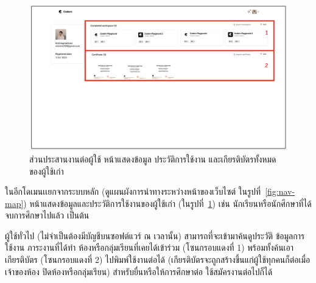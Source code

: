 \documentclass[12pt,oneside,openright,a4paper]{cpe-thai-project}
\begin{document}
    \hypertarget{ui-archive1}{
        \begin{figure}[H]
        \centering
            \includegraphics[width=15cm]{figure/ui/ui-archive1.png}
            \caption[ส่วนประสานงานต่อผู้ใช้ หน้าแสดงข้อมูลของผู้ใช้เก่า]{ส่วนประสานงานต่อผู้ใช้ หน้าแสดงข้อมูล ประวัติการใช้งาน และเกียรติบัตรทั้งหมด ของผู้ใช้เก่า}
            \label{fig:ui-archive1}
        \end{figure}
    }
    
    \begin{flushleft}
    ในอีกโดเมนเเยกจากระบบหลัก (ดูแผนผังการนำทางระหว่างหน้าของเว็บไซต์ ในรูปที่~\ref{fig:nav-map}) หน้าแสดงข้อมูลและประวัติการใช้งานของผู้ใช้เก่า (ในรูปที่~\ref{fig:ui-archive1}) เช่น นักเรียนหรือนักศึกษาที่ได้จบการศึกษาไปแล้ว เป็นต้น 
    \end{flushleft}
    \begin{flushleft}
    ผู้ใช้ทั่วไป (ไม่จำเป็นต้องมีบัญชีบนซอฟต์แวร์ ณ เวลานั้น) สามารถที่จะเข้ามาค้นดูประวัติ ข้อมูลการใช้งาน ภาระงานที่ได้ทำ ห้องหรือกลุ่มเรียนที่เคยได้เข้าร่วม (โซนกรอบแดงที่ 1) พร้อมทั้งค้นเอาเกียรติบัตร (โซนกรอบแดงที่ 2) ไปพิมพ์ใช้งานต่อได้ (เกียรติบัตรจะถูกสร้างขึ้นแก่ผู้ใช้ทุกคนก็ต่อเมื่อเจ้าของห้อง ปิดห้องหรือกลุ่มเรียน) สำหรับยื่นหรือให้การศึกษาต่อ ใช้สมัครงานต่อไปก็ได้
    \end{flushleft}
    
\pagebreak
\newpage
\end{document}
